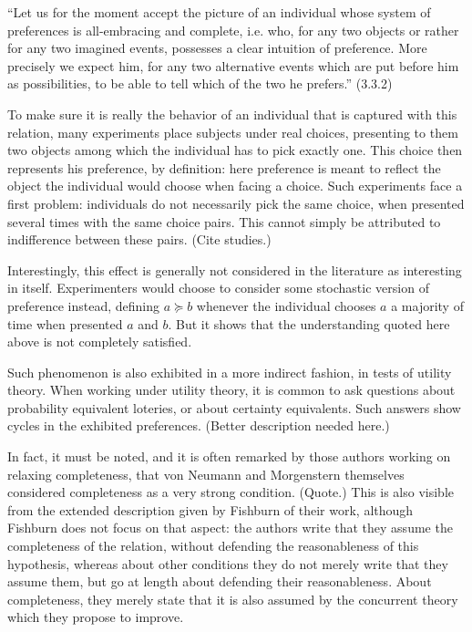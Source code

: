 \documentclass[french, english]{llncs}
\begin{document}
“Let us for the moment accept the picture of an individual whose system of preferences is all-embracing and complete, i.e. who, for any two objects or rather for any two imagined events, possesses a clear intuition of preference. More precisely we expect him, for any two alternative events which are put before him as possibilities, to be able to tell which of the two he prefers.” (3.3.2)

To make sure it is really the behavior of an individual that is captured with this relation, many experiments place subjects under real choices, presenting to them two objects among which the individual has to pick exactly one. This choice then represents his preference, by definition: here preference is meant to reflect the object the individual would choose when facing a choice. Such experiments face a first problem: individuals do not necessarily pick the same choice, when presented several times with the same choice pairs. This cannot simply be attributed to indifference between these pairs. (Cite studies.)

Interestingly, this effect is generally not considered in the literature as interesting in itself. Experimenters would choose to consider some stochastic version of preference instead, defining $a \succeq b$ whenever the individual chooses $a$ a majority of time when presented $a$ and $b$. But it shows that the understanding quoted here above is not completely satisfied.

Such phenomenon is also exhibited in a more indirect fashion, in tests of utility theory. When working under utility theory, it is common to ask questions about probability equivalent loteries, or about certainty equivalents. Such answers show cycles in the exhibited preferences. (Better description needed here.)

In fact, it must be noted, and it is often remarked by those authors working on relaxing completeness, that von Neumann and Morgenstern themselves considered completeness as a very strong condition. (Quote.) This is also visible from the extended description given by Fishburn of their work, although Fishburn does not focus on that aspect: the authors write that they assume the completeness of the relation, without defending the reasonableness of this hypothesis, whereas about other conditions they do not merely write that they assume them, but go at length about defending their reasonableness. About completeness, they merely state that it is also assumed by the concurrent theory which they propose to improve.
\end{document}
